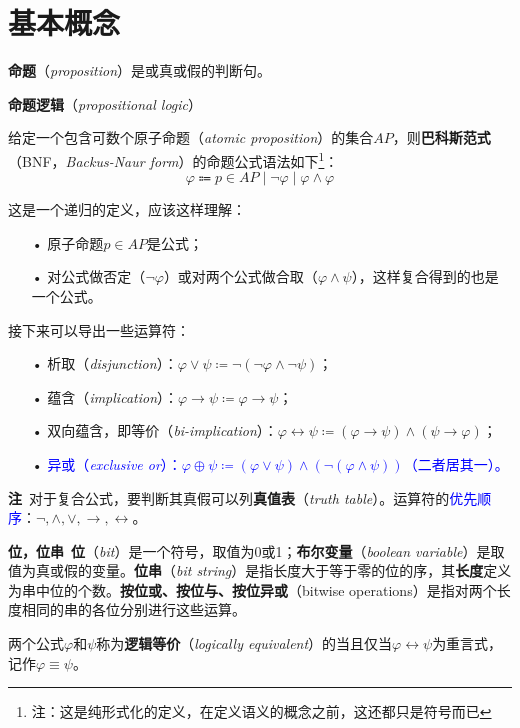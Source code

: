\documentclass[b5paper,oneside]{ctexbook}
\newcommand{\Blue}[1]{\textcolor[named]{blue}{#1}}
\begin{document}
\section{基本概念}
\textbf{命题}（\emph{proposition}）是或真或假的判断句。

\textbf{命题逻辑}（\emph{propositional logic}）

给定一个包含可数个原子命题（\emph{atomic proposition}）的集合$AP$，则\textbf{巴科斯范式}（BNF，\emph{Backus-Naur form}）的命题公式语法如下\footnote{注：这是纯形式化的定义，在定义语义的概念之前，这还都只是符号而已}：
\[\varphi\Coloneqq p\in AP\mid \neg\varphi\mid\varphi\land\varphi\]

这是一个递归的定义，应该这样理解：
\begin{enumerate}
\item[•]原子命题$p\in AP$是公式；
\item[•]对公式做否定（$\neg\varphi$）或对两个公式做合取（$\varphi\land\psi$），这样复合得到的也是一个公式。
\end{enumerate}

接下来可以导出一些运算符：
\begin{enumerate}
\item[•]析取（\emph{disjunction}）：$\varphi\lor\psi\coloneqq \neg(\neg\varphi\land\neg\psi)$；
\item[•]蕴含（\emph{implication}）：$\varphi\rightarrow\psi\coloneqq\varphi\rightarrow\psi$；
\item[•]双向蕴含，即等价（\emph{bi-implication}）：$\varphi\leftrightarrow\psi\coloneqq (\varphi\rightarrow\psi)\land(\psi\rightarrow\varphi)$；
\item[•]\Blue{异或（\emph{exclusive or}）：$\varphi\oplus\psi\coloneqq (\varphi\lor\psi)\land(\neg(\varphi\land\psi ))$（二者居其一）。}
\end{enumerate}

\textbf{注}\ 对于复合公式，要判断其真假可以列\textbf{真值表}（\emph{truth table}）。运算符的\Blue{优先顺序}：$\neg,\land,\lor,\rightarrow,\leftrightarrow$。

\textbf{位，位串}\ \textbf{位}（\emph{bit}）是一个符号，取值为0或1；\textbf{布尔变量}（\emph{boolean variable}）是取值为真或假的变量。\textbf{位串}（\emph{bit string}）是指长度大于等于零的位的序，其\textbf{长度}定义为串中位的个数。\textbf{按位或、按位与、按位异或}（bitwise operations）是指对两个长度相同的串的各位分别进行这些运算。

两个公式$\varphi$和$\psi$称为\textbf{逻辑等价}（\emph{logically equivalent}）的当且仅当$\varphi\leftrightarrow\psi$为重言式，记作$\varphi\equiv\psi$。
\end{document}
